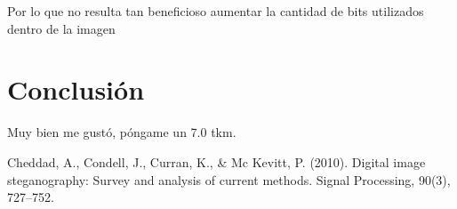 \documentclass[conference]{IEEEtran}
\begin{document}
	Por lo que no resulta tan beneficioso aumentar la cantidad de bits utilizados dentro de la imagen

\section*{Conclusión}
	Muy bien me gustó, póngame un 7.0 tkm.


\begin{thebibliography}{99}
 Cheddad, A., Condell, J., Curran, K., \& Mc Kevitt, P. (2010). Digital image 
steganography: Survey and analysis of current methods. Signal Processing, 90(3), 727–752. 


\end{thebibliography}
\end{document}
